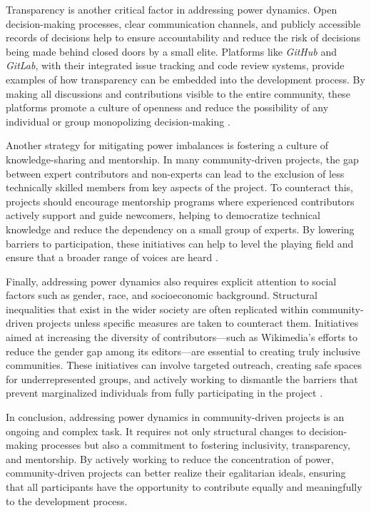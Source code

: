 \begin{refsection}
Transparency is another critical factor in addressing power dynamics. Open decision-making processes, clear communication channels, and publicly accessible records of decisions help to ensure accountability and reduce the risk of decisions being made behind closed doors by a small elite. Platforms like \textit{GitHub} and \textit{GitLab}, with their integrated issue tracking and code review systems, provide examples of how transparency can be embedded into the development process. By making all discussions and contributions visible to the entire community, these platforms promote a culture of openness and reduce the possibility of any individual or group monopolizing decision-making \cite[pp.~83-87]{feller2018}.

Another strategy for mitigating power imbalances is fostering a culture of knowledge-sharing and mentorship. In many community-driven projects, the gap between expert contributors and non-experts can lead to the exclusion of less technically skilled members from key aspects of the project. To counteract this, projects should encourage mentorship programs where experienced contributors actively support and guide newcomers, helping to democratize technical knowledge and reduce the dependency on a small group of experts. By lowering barriers to participation, these initiatives can help to level the playing field and ensure that a broader range of voices are heard \cite[pp.~98-101]{mcalevey2021}.

Finally, addressing power dynamics also requires explicit attention to social factors such as gender, race, and socioeconomic background. Structural inequalities that exist in the wider society are often replicated within community-driven projects unless specific measures are taken to counteract them. Initiatives aimed at increasing the diversity of contributors—such as Wikimedia’s efforts to reduce the gender gap among its editors—are essential to creating truly inclusive communities. These initiatives can involve targeted outreach, creating safe spaces for underrepresented groups, and actively working to dismantle the barriers that prevent marginalized individuals from fully participating in the project \cite[pp.~45-47]{ford2013}.

In conclusion, addressing power dynamics in community-driven projects is an ongoing and complex task. It requires not only structural changes to decision-making processes but also a commitment to fostering inclusivity, transparency, and mentorship. By actively working to reduce the concentration of power, community-driven projects can better realize their egalitarian ideals, ensuring that all participants have the opportunity to contribute equally and meaningfully to the development process.


\end{refsection}
